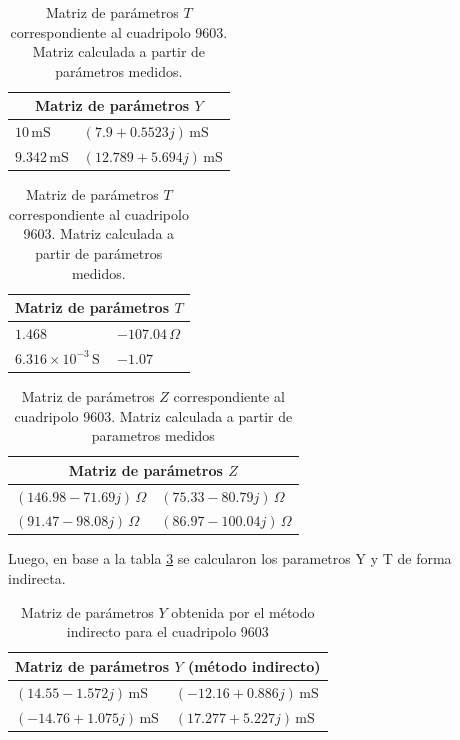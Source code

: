 	\begin{table}[H]
\centering
\begin{minipage}{0.48\textwidth}
\centering
\begin{tabular}{|l|l|}
\hline
\multicolumn{2}{|c|}{\textbf{Matriz de parámetros $Y$}} \\ \hline
$10\,\mathrm{mS}$ & $(7.9 + 0.5523j)\,\mathrm{mS}$ \\ \hline
$9.342\,\mathrm{mS}$ & $(12.789 + 5.694j)\,\mathrm{mS}$ \\ \hline
\end{tabular}
\caption{Matriz de parámetros $Y$ correspondiente al cuadripolo 9603. Matriz calculada a partir de parámetros medidos.}
\label{tab:matriz_Y9603}
\end{minipage}
\hfill
\begin{minipage}{0.48\textwidth}
\centering
\begin{tabular}{|l|l|}
\hline
\multicolumn{2}{|c|}{\textbf{Matriz de parámetros $T$}} \\ \hline
$1.468$ & $-107.04\,\Omega$ \\ \hline
$6.316\times10^{-3}\,\mathrm{S}$ & $-1.07$ \\ \hline
\end{tabular}
\caption{Matriz de parámetros $T$ correspondiente al cuadripolo 9603. Matriz calculada a partir de parámetros medidos.}
\label{tab:matriz_T9603}
\end{minipage}
\end{table}

\begin{table}[H]
\centering
\begin{tabular}{|l|l|}
\hline
\multicolumn{2}{|c|}{\textbf{Matriz de parámetros $Z$}} \\ \hline
$(146.98 - 71.69j)\,\Omega$ & $(75.33 - 80.79j)\,\Omega$ \\ \hline
$(91.47 - 98.08j)\,\Omega$ & $(86.97 - 100.04j)\,\Omega$ \\ \hline
\end{tabular}
\caption{Matriz de parámetros $Z$ correspondiente al cuadripolo 9603. Matriz calculada a partir de parametros medidos}
\label{tab:matriz_Z9603}
\end{table}

Luego, en base a la tabla \ref{tab:matriz_Z9603} se calcularon los parametros Y y T de forma indirecta.

\begin{table}[H]
\centering
\begin{tabular}{|l|l|}
\hline
\multicolumn{2}{|c|}{\textbf{Matriz de parámetros $Y$ (método indirecto)}} \\ \hline
$(14.55 - 1.572j)\,\mathrm{mS}$ & $(-12.16 + 0.886j)\,\mathrm{mS}$ \\ \hline
$(-14.76 + 1.075j)\,\mathrm{mS}$ & $(17.277 + 5.227j)\,\mathrm{mS}$ \\ \hline
\end{tabular}
\caption{Matriz de parámetros $Y$ obtenida por el método indirecto para el cuadripolo 9603}
\label{tab:matriz_Y9603_indirecta}
\end{table}

